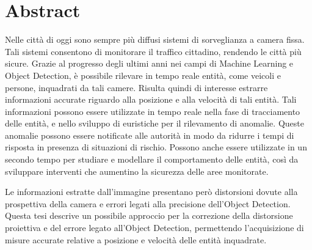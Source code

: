 \chapter*{Abstract}
Nelle città di oggi sono sempre più diffusi sistemi di sorveglianza a camera fissa.
Tali sistemi consentono di monitorare il traffico cittadino, rendendo le città più sicure.
Grazie al progresso degli ultimi anni nei campi di Machine Learning e Object Detection, è possibile rilevare in tempo reale entità, come veicoli e persone, inquadrati da tali camere.
Risulta quindi di interesse estrarre informazioni accurate riguardo alla posizione e alla velocità di tali entità. 
Tali informazioni possono essere utilizzate in tempo reale nella fase di tracciamento delle entità, e nello sviluppo di euristiche per il rilevamento di anomalie.
Queste anomalie possono essere notificate alle autorità in modo da ridurre i tempi di risposta in presenza di situazioni di rischio.
Possono anche essere utilizzate in un secondo tempo per studiare e modellare il comportamento delle entità, così da sviluppare interventi che aumentino la sicurezza delle aree monitorate.

Le informazioni estratte dall'immagine presentano però distorsioni dovute alla prospettiva della camera e errori legati alla precisione dell'Object Detection.
Questa tesi descrive un possibile approccio per la correzione della distorsione proiettiva e del errore legato all'Object Detection, permettendo l'acquisizione di misure accurate relative a posizione e velocità delle entità inquadrate.

